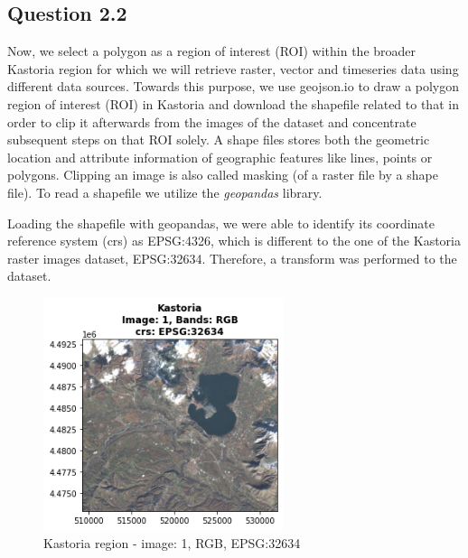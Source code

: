 \subsection{Question 2.2}
Now, we select a polygon as a region of interest (ROI) within the broader Kastoria region for which we will retrieve raster, vector and timeseries data using different data sources. 
Towards this purpose, we use geojson.io to draw a polygon region of interest (ROI) in Kastoria and download the shapefile related to that in order to clip it afterwards from the images of the dataset and concentrate subsequent steps on that ROI solely. A shape files stores both the geometric location and attribute information of geographic features like lines, points or polygons. Clipping an image is also called masking (of a raster file by a shape file). To read a shapefile we utilize the \emph{geopandas} library.

Loading the shapefile with geopandas, we were able to identify its coordinate reference system (crs) as EPSG:4326, which is different to the one of the Kastoria raster images dataset, EPSG:32634. Therefore, a transform was performed to the dataset. 

\begin{figure}[h]
    \centering
    \includegraphics[width=7cm]{figures/q2_1_rasterio_image1_rgb_image_old_crs.png}
    \caption{Kastoria region - image: 1, RGB, EPSG:32634}
    \label{fig:Kastoria region - image: 1, RGB, EPSG:32634}
\end{figure}
\FloatBarrier %

